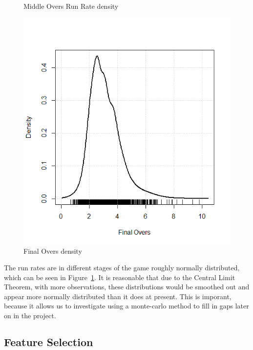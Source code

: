 \begin{figure}
      \caption{Middle Overs Run Rate density}
    \endminipage\hfill
      \includegraphics[width=\linewidth]{figures/finaloversdens.png}
      \caption{Final Overs density}
    \endminipage
    \label{rrDensitiesPlot}
\end{figure}

The run rates are  in different stages of the game roughly normally distributed, which can be seen in Figure~\ref{rrDensitiesPlot}. It is reasonable that due to the Central Limit Theorem, with more observations, these distributions would be smoothed out and 
appear more normally distributed than it does at present. This is imporant, because it allows us to investigate using a monte-carlo method to fill in gaps 
later on in the project.

\subsection{Feature Selection}
\label{lassoSec}

